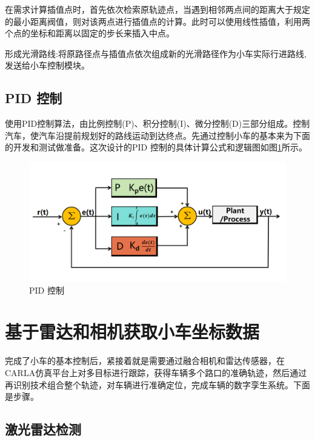 在需求计算插值点时，首先依次检索原轨迹点，当遇到相邻两点间的距离大于规定 的最小距离阀值，则对该两点进行插值点的计算。此时可以使用线性插值，利用两个点的坐标和距离以固定的步长来插入中点。

形成光滑路线:将原路径点与插值点依次组成新的光滑路径作为小车实际行进路线, 发送给小车控制模块。

\subsection{PID 控制}

使用PID控制算法，由比例控制(P)、积分控制(I)、微分控制(D)三部分组成。控制 汽车，使汽车沿提前规划好的路线运动到达终点。先通过控制小车的基本来为下面的开发和测试做准备。这次设计的PID 控制的具体计算公式和逻辑图如图\ref{fig:p17}所示。


\begin{figure}[htbp] %
	\centering
	\includegraphics[width=1\textwidth]{p17} %
	\caption{PID 控制} %
	\label{fig:p17} %
\end{figure}






\section{基于雷达和相机获取小车坐标数据}
完成了小车的基本控制后，紧接着就是需要通过融合相机和雷达传感器，在CARLA仿真平台上对多目标进行跟踪，获得车辆多个路口的准确轨迹，然后通过再识别技术组合整个轨迹，对车辆进行准确定位，完成车辆的数字孪生系统。下面是步骤。

\subsection{激光雷达检测}

